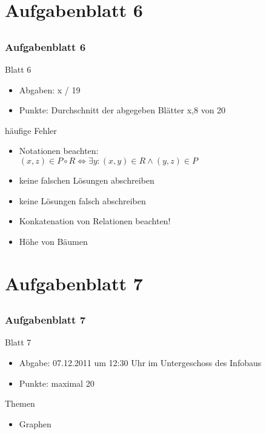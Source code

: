 

\section[Rückblick]{Aufgabenblatt 6}
\subsection*{}
\begin{frame}
	\frametitle{Aufgabenblatt 6}
	\begin{block}{Blatt 6}
		\begin{itemize}
			\item Abgaben: x / 19
			\item Punkte: Durchschnitt der abgegeben Blätter x,8 von 20
		\end{itemize}
   \end{block}
	\begin{block}{häufige Fehler}
 		\begin{itemize}
 	  		\item Notationen beachten: \\
			$(x,z) \in P \circ R \Leftrightarrow \exists y: (x,y)\in R \land  (y,z)\in P$\pause
 	  		\item keine falschen Lösungen abschreiben\pause
			\item keine Lösungen falsch abschreiben\pause
      \item Konkatenation von Relationen beachten! \pause
      \item Höhe von Bäumen
 	  \end{itemize}
	\end{block}
\end{frame}

\section[Blatt 7]{Aufgabenblatt 7}
\subsection*{}
\begin{frame}
	\frametitle{Aufgabenblatt 7}
	\begin{block}{Blatt 7}
		\begin{itemize}
			\item Abgabe: 07.12.2011 um 12:30 Uhr im Untergeschoss des Infobaus
			\item Punkte: maximal 20
		\end{itemize}
  	\end{block}
	\begin{block}{Themen}
		\begin{itemize}
	  		\item Graphen
	 	\end{itemize}
	\end{block}
\end{frame}
